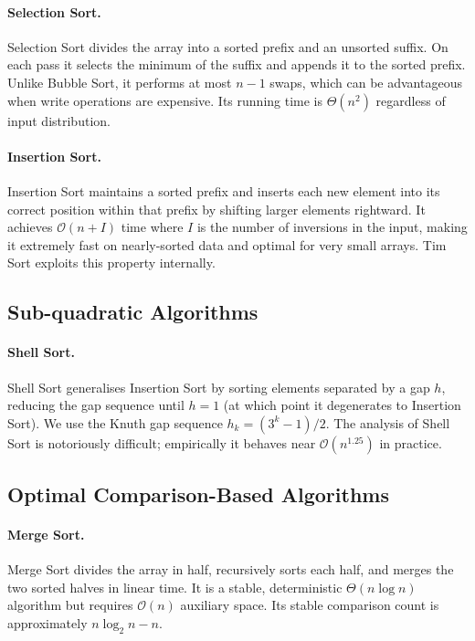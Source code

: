 \documentclass[11pt,a4paper]{article}
\begin{document}
\paragraph{Selection Sort.}
Selection Sort divides the array into a sorted prefix and an unsorted suffix.
On each pass it selects the minimum of the suffix and appends it to the sorted prefix.
Unlike Bubble Sort, it performs at most $n-1$ swaps, which can be advantageous when
write operations are expensive. Its running time is $\Theta(n^2)$ regardless of input
distribution.

\paragraph{Insertion Sort.}
Insertion Sort maintains a sorted prefix and inserts each new element into its correct
position within that prefix by shifting larger elements rightward.
It achieves $\mathcal{O}(n + I)$ time where $I$ is the number of inversions in the
input, making it extremely fast on nearly-sorted data and optimal for very small arrays.
Tim Sort exploits this property internally.

\subsection{Sub-quadratic Algorithms}

\paragraph{Shell Sort.}
Shell Sort generalises Insertion Sort by sorting elements separated by a gap $h$,
reducing the gap sequence until $h = 1$ (at which point it degenerates to Insertion
Sort). We use the Knuth gap sequence $h_k = (3^k - 1)/2$.
The analysis of Shell Sort is notoriously difficult; empirically it behaves near
$\mathcal{O}(n^{1.25})$ in practice.

\subsection{Optimal Comparison-Based Algorithms}

\paragraph{Merge Sort.}
Merge Sort divides the array in half, recursively sorts each half, and merges the two
sorted halves in linear time. It is a stable, deterministic $\Theta(n \log n)$ algorithm
but requires $\mathcal{O}(n)$ auxiliary space. Its stable comparison count is
approximately $n \log_2 n - n$.
\end{document}
